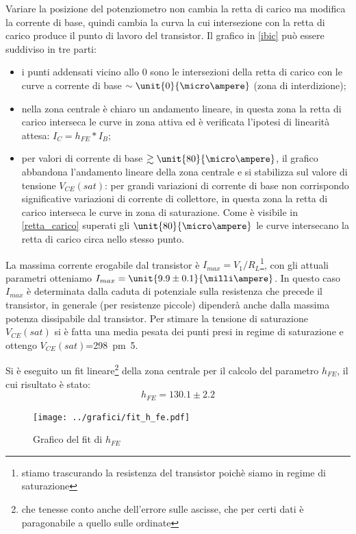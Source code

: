 \documentclass[10pt,a4paper]{article}
\begin{document}
Variare la posizione del potenziometro non cambia la retta di carico ma modifica la corrente di base, quindi cambia la curva la cui intersezione con la retta di carico produce il punto di lavoro del transistor.
Il grafico in \figurename{\ref{ibic}} può essere suddiviso in tre parti:
\begin{itemize}
	\item i punti addensati vicino allo $0$ sono le intersezioni della retta di carico con le curve a corrente di base $\sim \unit{ 0}{\micro\ampere}$ (zona di interdizione);
	\item nella zona centrale è chiaro un andamento lineare, in questa zona la retta di carico interseca le curve in zona attiva ed è verificata l'ipotesi di linearità attesa: $I_C = h_{FE}*I_B$;
	\item per valori di corrente di base $\gtrsim \unit{80}{\micro\ampere}$, il grafico abbandona l'andamento lineare della zona centrale e si stabilizza sul valore di tensione $V_{CE}(sat)$: per grandi variazioni di corrente di base non corrispondo significative variazioni di corrente di collettore, in questa zona la retta di carico interseca le curve in zona di saturazione. Come è visibile in \figurename{\ref{retta_carico}} superati gli $\unit{80}{\micro\ampere}$ le curve intersecano la retta di carico circa nello stesso punto.
\end{itemize}
La massima corrente erogabile dal transistor è $I_{max}=V_1/R_L$\footnote{stiamo trascurando la resistenza del transistor poichè siamo in regime di saturazione}, con gli attuali parametri otteniamo $I_{max}=\unit{9.9 \pm 0.1}{\milli\ampere}$. In questo caso $I_{max}$ è determinata dalla caduta di potenziale sulla resistenza che precede il transistor, in generale (per resistenze piccole) dipenderà anche dalla massima potenza dissipabile dal transistor.
Per stimare la tensione di saturazione $V_{CE}(sat)$ si è fatta una media pesata dei punti presi in regime di saturazione e ottengo $V_{CE}(sat)$=\unit{298 \pm 5}{\milli\volt}.

Si è eseguito un fit lineare\footnote{che tenesse conto anche dell'errore sulle ascisse, che per certi dati è paragonabile a quello sulle ordinate} della zona centrale per il calcolo del parametro $h_{FE}$, il cui risultato è stato:
\begin{equation*}
h_{FE} = 130.1 \pm 2.2
\end{equation*}
\begin{figure}[h!]
	\centering
	\texttt{[image: ../grafici/fit\_h\_fe.pdf]}
	\caption{Grafico del fit di $h_{FE}$}
\end{figure}
\end{document}
